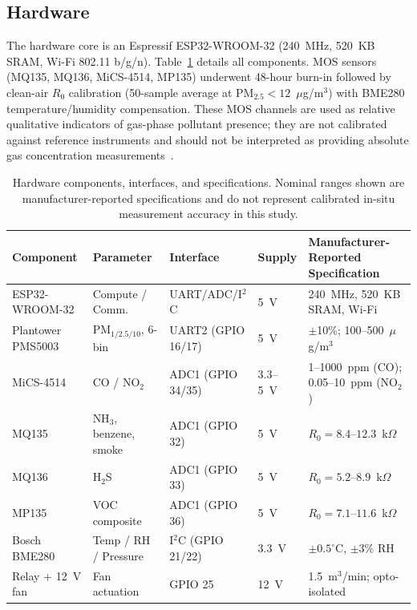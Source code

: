 \documentclass[12pt,a4paper]{article}
\newcommand{\ugsm}{$\mu$g/m$^3$}
\begin{document}
\subsection{Hardware}
\label{sec:hw}

The hardware core is an Espressif ESP32-WROOM-32 (240~MHz, 520~KB SRAM, Wi-Fi 802.11
b/g/n). Table~\ref{tab:hw} details all components. MOS sensors (MQ135, MQ136,
MiCS-4514, MP135) underwent 48-hour burn-in followed by clean-air $R_0$ calibration
(50-sample average at PM$_{2.5}<12$~\ugsm) with BME280 temperature/humidity compensation.
These MOS channels are used as relative qualitative indicators of gas-phase pollutant
presence; they are not calibrated against reference instruments and should not be
interpreted as providing absolute gas concentration measurements~\citep{lowcostpm2025acs,
mos2024trac}.

\begin{table}[htbp]
\centering
\caption{Hardware components, interfaces, and specifications. Nominal ranges shown are manufacturer-reported specifications and do not represent calibrated in-situ measurement accuracy in this study.}
\label{tab:hw}
\footnotesize
\setlength{\tabcolsep}{3pt}
\begin{tabular}{@{}p{2.8cm}p{2.6cm}p{1.5cm}p{1.1cm}p{4.8cm}@{}}
\toprule
\textbf{Component} & \textbf{Parameter} & \textbf{Interface} &
\textbf{Supply} & \textbf{Manufacturer-Reported Specification} \\
\midrule
ESP32-WROOM-32    & Compute / Comm.          & UART/ADC/I$^2$C & 5~V  & 240~MHz, 520~KB SRAM, Wi-Fi \\
Plantower PMS5003 & PM$_{1/2.5/10}$, 6-bin  & UART2 (GPIO 16/17) & 5~V  & $\pm$10\%; 100--500~\ugsm \\
MiCS-4514         & CO / NO$_2$             & ADC1 (GPIO 34/35)  & 3.3--5~V & 1--1000~ppm (CO); 0.05--10~ppm (NO$_2$) \\
MQ135             & NH$_3$, benzene, smoke  & ADC1 (GPIO 32)     & 5~V  & $R_0=8.4$--$12.3$~k$\Omega$ \\
MQ136             & H$_2$S                  & ADC1 (GPIO 33)     & 5~V  & $R_0=5.2$--$8.9$~k$\Omega$ \\
MP135             & VOC composite           & ADC1 (GPIO 36)     & 5~V  & $R_0=7.1$--$11.6$~k$\Omega$ \\
Bosch BME280      & Temp / RH / Pressure    & I$^2$C (GPIO 21/22)& 3.3~V & $\pm0.5^\circ$C, $\pm$3\% RH \\
Relay + 12~V fan  & Fan actuation           & GPIO 25            & 12~V & 1.5~m$^3$/min; opto-isolated \\
\bottomrule
\end{tabular}
\end{table}
\end{document}
